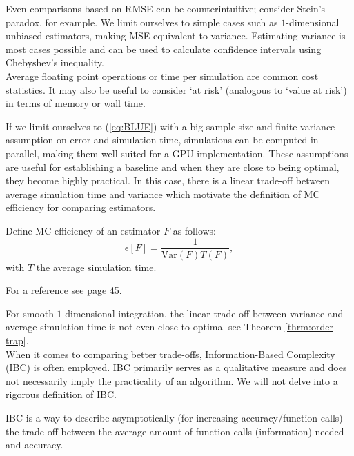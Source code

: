 \documentclass[a4paper,12pt]{article}
\begin{document}
Even comparisons based on RMSE can be counterintuitive; consider Stein's paradox,
for example. We limit ourselves to simple cases such as $1$-dimensional
unbiased estimators, making MSE equivalent to variance.
Estimating variance is most cases possible and can be used to calculate
confidence intervals using Chebyshev's inequality.\\

Average floating point operations or time per simulation are common cost statistics.
It may also be useful to consider \enquote*{at risk}  (analogous to \enquote*{value at risk})
in terms of memory or wall time.

If we limit ourselves to (\ref{eq:BLUE}) with a big sample size and
finite variance assumption on error and simulation time,
simulations can be computed in parallel, making them well-suited for a GPU implementation.
These assumptions are useful for establishing a baseline and
when they are close to being optimal, they become highly practical.
In this case, there is a linear trade-off
between average simulation time and variance which motivate
the definition of MC efficiency for comparing estimators.

\begin{definition}
  Define MC efficiency of an
  estimator $F$ as follows:
  \begin{equation}
    \epsilon[F]=\frac{1}{\text{Var}(F) T(F)},
  \end{equation}
  with $T$ the average simulation time.
\end{definition}

\begin{related}
  For a reference see \cite{veach_robust_1997} page 45.
\end{related}

For smooth $1$-dimensional integration, the linear trade-off between
variance and average simulation time is not even close to optimal see
Theorem \ref{thrm:order trap}. \\
When it comes to comparing better trade-offs,
Information-Based Complexity (IBC) is often employed.
IBC primarily serves as a
qualitative measure and does not necessarily imply the
practicality of an algorithm. We will not delve into a
rigorous definition of IBC.

\begin{definition}
  IBC is a way to describe asymptotically (for increasing accuracy/function calls)
  the trade-off between the average amount of function calls (information)
  needed and accuracy.
\end{definition}
\end{document}
